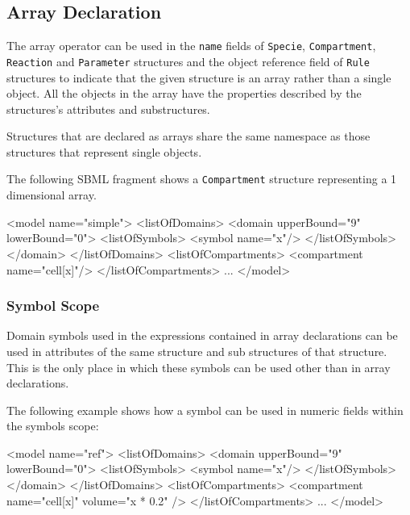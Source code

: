\documentclass{cekarticle}
\begin{document}
\subsection{Array Declaration}

The array operator can be used in the \texttt{name} fields of
\texttt{Specie}, \texttt{Compartment}, \texttt{Reaction} and
\texttt{Parameter} structures and the object reference field of
\texttt{Rule} structures to indicate that the given structure is
an array rather than a single object. All the objects in the
array have the properties described by the structures's
attributes and substructures.

Structures that are declared as arrays share the same namespace
as those structures that represent single objects.

The following SBML fragment shows a \texttt{Compartment}
structure representing a 1 dimensional array.

\begin{example}
<model name="simple">
    <listOfDomains>
        <domain upperBound="9" lowerBound="0">
            <listOfSymbols>
                <symbol name="x"/>
            </listOfSymbols>
        </domain>
    </listOfDomains>
    <listOfCompartments>
        <compartment name="cell[x]"/>
    </listOfCompartments>
    ...
</model>
\end{example}

\subsubsection{Symbol Scope}

Domain symbols used in the expressions contained in array declarations
can be used in attributes of the same structure and sub
structures of that structure.  This is the only place in which
these symbols can be used other than in array declarations.

The following example shows how a symbol can be used in numeric
fields within the symbols scope:

\begin{example}
<model name="ref">
    <listOfDomains>
        <domain upperBound="9" lowerBound="0">
            <listOfSymbols>
                <symbol name="x"/>
            </listOfSymbols>
        </domain>
    </listOfDomains>
    <listOfCompartments>
        <compartment name="cell[x]" volume="x * 0.2" />
    </listOfCompartments>
    ...
</model>
\end{example}
\end{document}
